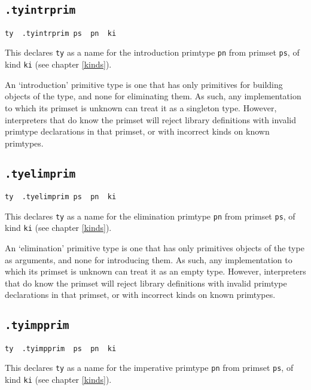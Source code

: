 \documentclass{report}
\newcommand\stringcode[1]{\texttt{#1}}
\begin{document}
\subsection{\stringcode{.tyintrprim}}

\begin{verbatim}
ty	.tyintrprim	ps	pn	ki
\end{verbatim}

This declares \stringcode{ty} as a name for the introduction primtype \stringcode{pn} from primset \stringcode{ps}, of kind \stringcode{ki} (see chapter \ref{kinds}).

An `introduction' primitive type is one that has only primitives for building objects of the type, and none for eliminating them.
As such, any implementation to which its primset is unknown can treat it as a singleton type.
However, interpreters that do know the primset will reject library definitions with invalid primtype declarations in that primset,
or with incorrect kinds on known primtypes.

\subsection{\stringcode{.tyelimprim}}

\begin{verbatim}
ty	.tyelimprim	ps	pn	ki
\end{verbatim}

This declares \stringcode{ty} as a name for the elimination primtype \stringcode{pn} from primset \stringcode{ps}, of kind \stringcode{ki} (see chapter \ref{kinds}).

An `elimination' primitive type is one that has only primitives objects of the type as arguments, and none for introducing them.
As such, any implementation to which its primset is unknown can treat it as an empty type.
However, interpreters that do know the primset will reject library definitions with invalid primtype declarations in that primset,
or with incorrect kinds on known primtypes.

\subsection{\stringcode{.tyimpprim}}

\begin{verbatim}
ty	.tyimpprim	ps	pn	ki
\end{verbatim}

This declares \stringcode{ty} as a name for the imperative primtype \stringcode{pn} from primset \stringcode{ps}, of kind \stringcode{ki} (see chapter \ref{kinds}).
\end{document}
